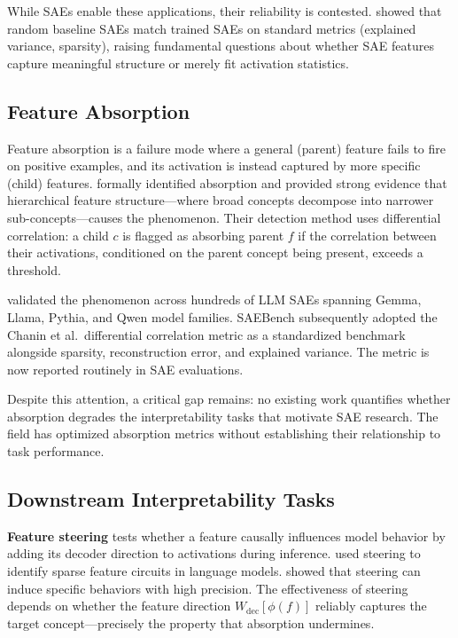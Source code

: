 \documentclass{article}
\begin{document}
While SAEs enable these applications, their reliability is contested. \citet{korznikov2026ort} showed that random baseline SAEs match trained SAEs on standard metrics (explained variance, sparsity), raising fundamental questions about whether SAE features capture meaningful structure or merely fit activation statistics.

\subsection{Feature Absorption}

Feature absorption is a failure mode where a general (parent) feature fails to fire on positive examples, and its activation is instead captured by more specific (child) features. \citet{chanin2024causal} formally identified absorption and provided strong evidence that hierarchical feature structure---where broad concepts decompose into narrower sub-concepts---causes the phenomenon. Their detection method uses differential correlation: a child $c$ is flagged as absorbing parent $f$ if the correlation between their activations, conditioned on the parent concept being present, exceeds a threshold.

\citet{chanin2024causal} validated the phenomenon across hundreds of LLM SAEs spanning Gemma, Llama, Pythia, and Qwen model families. SAEBench \citep{karvonen2025saebench} subsequently adopted the Chanin et al.~differential correlation metric as a standardized benchmark alongside sparsity, reconstruction error, and explained variance. The metric is now reported routinely in SAE evaluations.

Despite this attention, a critical gap remains: no existing work quantifies whether absorption degrades the interpretability tasks that motivate SAE research. The field has optimized absorption metrics without establishing their relationship to task performance.

\subsection{Downstream Interpretability Tasks}

\textbf{Feature steering} tests whether a feature causally influences model behavior by adding its decoder direction to activations during inference. \citet{marks2024sparse} used steering to identify sparse feature circuits in language models. \citet{rimsky2024steering} showed that steering can induce specific behaviors with high precision. The effectiveness of steering depends on whether the feature direction $W_{\text{dec}}[\phi(f)]$ reliably captures the target concept---precisely the property that absorption undermines.
\end{document}
